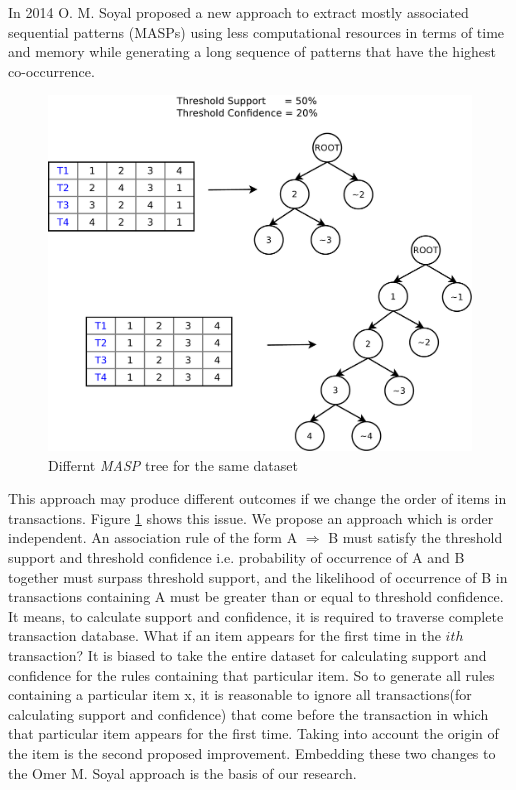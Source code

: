 \documentclass[review]{elsarticle}
\begin{document}
In 2014 O. M. Soyal \cite{oldmasp} proposed a new approach to extract mostly associated sequential patterns (MASPs) using less computational resources in terms of time and memory while generating a long sequence of patterns that have the highest co-occurrence.

\begin{figure}
\begin{center}
\includegraphics[scale=0.30]{pdf/firstimprove}
\end{center}
\caption{Differnt \emph{MASP} tree for the same dataset}
\label{Fig 12}
\end{figure}

This approach may produce different outcomes if we change the order of items in transactions. Figure \ref{Fig 12} shows this issue. We propose an approach which is order independent. An association rule of the form A $\Rightarrow$ B must satisfy the threshold support and threshold confidence i.e. probability of occurrence of A and B together must surpass threshold support, and the likelihood of occurrence of B in transactions containing A must be greater than or equal to threshold confidence. It means, to calculate support and confidence, it is required to traverse complete transaction database. What if an item appears for the first time in the $ ith $ transaction? It is biased to take the entire dataset for calculating support and confidence for the rules containing that particular item. So to generate all rules containing a particular item x, it is reasonable to ignore all transactions(for calculating support and confidence) that come before the transaction in which that particular item appears for the first time. Taking into account the origin of the item is the second proposed improvement. Embedding these two changes to the Omer M. Soyal \cite{oldmasp} approach is the basis of our research.
\end{document}
